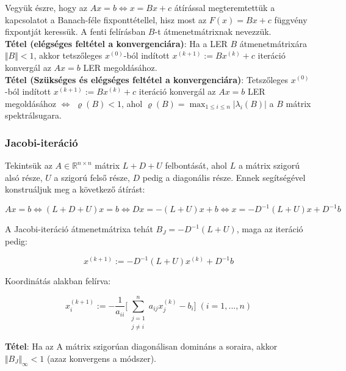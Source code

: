\documentclass[margin=0px]{article}
\begin{document}
	Vegyük észre, hogy az $Ax = b \Longleftrightarrow x = Bx + c$ átírással megteremtettük a kapcsolatot a
	Banach-féle	fixponttétellel, hisz most az $F(x) = Bx + c$ függvény fixpontját keressük. A fenti felírásban
	$B$-t átmenetmátrixnak nevezzük.\\
	
	\noindent \textbf{Tétel (elégséges feltétel a konvergenciára)}: Ha a LER $B$ átmenetmátrixára $\Vert B \Vert < 1$,
	akkor tetszőleges $x^{(0)}$-ból indított $x^{(k+1)} := Bx^{(k)} + c$ iteráció konvergál az $Ax = b$ LER megoldásához.\\
	
	\noindent \textbf{Tétel (Szükséges és elégséges feltétel a konvergenciára)}: Tetszőleges $x^{(0)}$-ból indított
	$x^{(k+1)} := Bx^{(k)} + c$ iteráció konvergál az $Ax = b$ LER megoldásához $\Longleftrightarrow$
	$\varrho(B) < 1$, ahol $\varrho(B) = \max_{1 \leq i \leq n} |\lambda_{i}(B)|$ a $B$ mátrix spektrálsugara.
	
	\subsubsection{Jacobi-iteráció}
	
	Tekintsük az $A \in \mathbb{R}^{n \times n}$ mátrix $L + D + U$ felbontását, ahol $L$ a mátrix szigorú alsó része, $U$ a
	szigorú felső része, $D$ pedig a diagonális része. Ennek segítségével konstruáljuk meg a következő átírást:
	
	\begin{displaymath}
		Ax = b \Longleftrightarrow (L + D + U)x = b \Longleftrightarrow Dx = -(L+U)x+b \Longleftrightarrow
		x = -D^{-1}(L+U)x + D^{-1}b
	\end{displaymath}
	
	\noindent A Jacobi-iteráció átmenetmátrixa tehát $B_{J} = -D^{-1}(L + U)$, maga az iteráció pedig:
	
	\begin{displaymath}
		x^{(k+1)} :=  -D^{-1}(L + U)x^{(k)} + D^{-1}b
	\end{displaymath}
	
	\noindent Koordinátás alakban felírva:
	
	\begin{displaymath}
		x^{(k+1)}_{i} :=
		-\frac{1}{a_{ii}}
		\Bigg[
		\sum_{\substack{j=1\\ j \not = i}}^{n} a_{ij}x_{j}^{(k)} - b_{i}
		\Bigg]
		\; (i = 1, ..., n)
	\end{displaymath}
	
	\noindent \textbf{Tétel}: Ha az A mátrix szigorúan diagonálisan domináns a soraira, akkor
	$\Vert B_{J} \Vert_{\infty} < 1$ (azaz konvergens a módszer).\\ 
	
\end{document}

